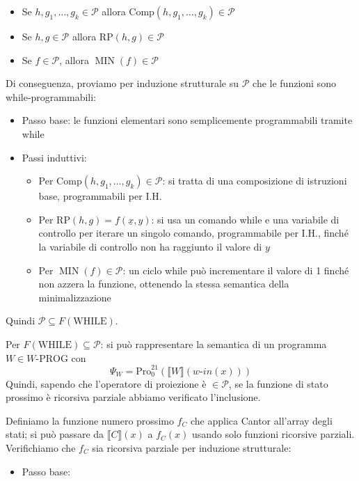 \documentclass[12pt, answers]{exam}
\theoremstyle{plain}
\DeclareMathOperator{\MIN}{MIN}
\newcommand{\while}{\text{WHILE}}
\newcommand{\wprog}{W\text{-PROG}}
\newcommand{\comp}{\text{Comp}}
\newcommand{\rp}{\text{RP}}
\newcommand{\cp}{\mathcal{P}}
\newcommand{\pro}{\text{Pro}}
\newcommand{\win}{w\text{-}in}
\begin{document}
\begin{questions}
\begin{solution}
\begin{itemize}
                \item Se $h, g_1, \dots, g_k \in \cp$ allora $\comp(h, g_1, \dots, g_k) \in \cp$
                
                \item Se $h, g \in \cp$ allora $\rp(h,g) \in \cp$ 
                
                \item Se $f \in \cp$, allora $\MIN (f) \in \cp$
            \end{itemize}
            
             Di conseguenza, proviamo per induzione strutturale su $\cp$ che le funzioni sono while-programmabili: 
            \begin{itemize}
                \item Passo base: le funzioni elementari sono semplicemente programmabili tramite while
                
                \item Passi induttivi: 
                \begin{itemize}
                    \item Per $\comp (h,g_1, \dots, g_k) \in \cp$: si tratta di una composizione di istruzioni base, programmabili per I.H.
                    
                    \item Per $\rp (h, g) = f(\underline{x}, y)$: si usa un comando while e una variabile di controllo per iterare un singolo comando, programmabile per I.H., finché la variabile di controllo non ha raggiunto il valore di $y$
                    
                    \item Per $\MIN(f) \in \cp$: un ciclo while può incrementare il valore di 1 finché non azzera la funzione, ottenendo la stessa semantica della minimalizzazione
                \end{itemize}
            \end{itemize}
            Quindi $\cp \subseteq F(\while)$.
            
            Per $F(\while) \subseteq \cp$: si può rappresentare la semantica di un programma $W \in \wprog$ con 
            $$ \Psi_W = \pro^{21}_0 (\llbracket W \rrbracket (\win (x))) $$
            Quindi, sapendo che l'operatore di proiezione è $\in \cp$, se la funzione di stato prossimo è ricorsiva parziale abbiamo verificato l'inclusione. 
            
            Definiamo la funzione numero prossimo $f_C$ che applica Cantor all'array degli stati; si può passare da $\llbracket C \rrbracket (x)$ a $f_C (x)$ usando solo funzioni ricorsive parziali. Verifichiamo che $f_C$ sia ricorsiva parziale per induzione strutturale: 
            \begin{itemize}
                \item Passo base:
                

\end{itemize}
\end{solution}
\end{questions}
\end{document}
